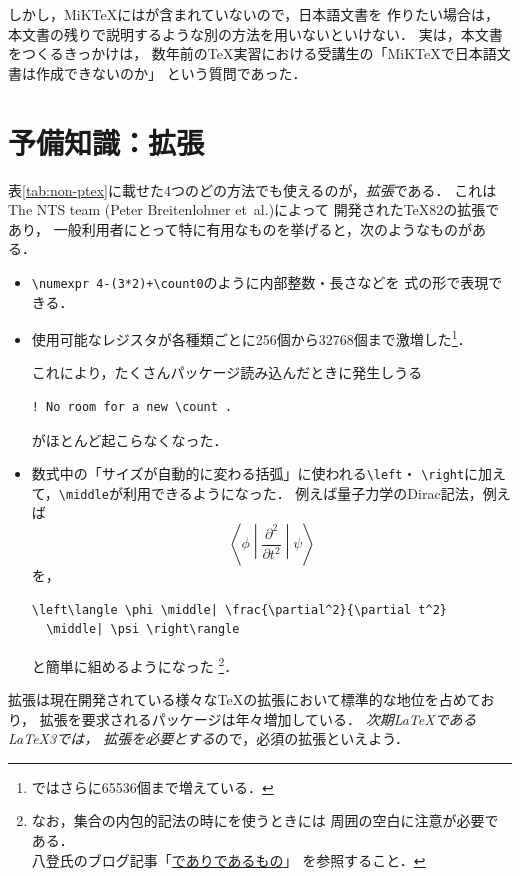 \documentclass[b5paper]{bxjsarticle} %
\begin{document}
しかし，MiK\TeX には\pLaTeX が含まれていないので，日本語文書を
作りたい場合は，本文書の残りで説明するような別の方法を用いないといけない．
実は，本文書をつくるきっかけは，
数年前の\TeX 実習における受講生の「MiK\TeX で日本語文書は作成できないのか」
という質問であった．



\newpage

\section{予備知識：\eTeX 拡張}
\label{sec:etex}
表\>\ref{tab:non-ptex}\>に載せた4つのどの方法でも使えるのが，\emph{\eTeX 拡張}である．
これはThe NTS team (Peter Breitenlohner et~al.)によって
開発された\TeX82の拡張であり，
一般利用者にとって特に有用なものを挙げると，次のようなものがある．
\begin{itemize}
\item \verb!\numexpr 4-(3*2)+\count0!のように内部整数・長さなどを
  式の形で表現できる．
\item 使用可能なレジスタが各種類ごとに256個から32768個まで激増した\footnote{%
  \LuaTeX{}ではさらに65536個まで増えている．}．

これにより，たくさんパッケージ読み込んだときに発生しうる
\begin{lstlisting}
! No room for a new \count .
\end{lstlisting}
がほとんど起こらなくなった．

\item 数式中の「サイズが自動的に変わる括弧」に使われる\verb+\left+・
  \verb+\right+に加えて，\verb+\middle+が利用できるようになった．
  例えば量子力学のDirac記法，例えば
\[
 \left\langle \phi \middle| \frac{\partial^2}{\partial t^2} \middle| \psi \right\rangle
\]
を，
\begin{lstlisting}
\left\langle \phi \middle| \frac{\partial^2}{\partial t^2}
  \middle| \psi \right\rangle
\end{lstlisting}
  と簡単に組めるようになった%
  \footnote{なお，集合の内包的記法の時にを使うときには
  周囲の空白に注意が必要である．\\
  八登氏のブログ記事「\href{https://zrbabbler.hatenablog.com/entry/20120411/1334151482}%
  {でありであるもの}」
  を参照すること．}．
\end{itemize}
\eTeX 拡張は現在開発されている様々な\TeX の拡張において標準的な地位を占めており，
\eTeX 拡張を要求されるパッケージは年々増加している．
\emph{次期\LaTeX である\LaTeX3では，
\eTeX 拡張を必要とする}ので，必須の拡張といえよう．
\end{document}
